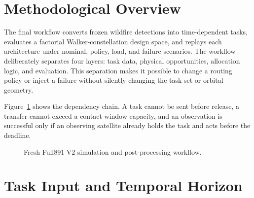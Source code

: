\section{Methodological Overview}

The final workflow converts frozen wildfire detections into time-dependent tasks, evaluates a factorial Walker-constellation design space, and replays each architecture under nominal, policy, load, and failure scenarios. The workflow deliberately separates four layers: task data, physical opportunities, allocation logic, and evaluation. This separation makes it possible to change a routing policy or inject a failure without silently changing the task set or orbital geometry.

Figure~\ref{fig:method_workflow} shows the dependency chain. A task cannot be sent before release, a transfer cannot exceed a contact-window capacity, and an observation is successful only if an observing satellite already holds the task and acts before the deadline.

\begin{figure}[htbp]
\centering
{}
\caption{Fresh Full891 V2 simulation and post-processing workflow.}
\label{fig:method_workflow}
\end{figure}

\section{Task Input and Temporal Horizon}

